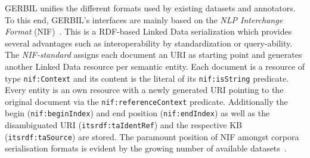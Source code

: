 GERBIL unifies the different formats used by existing datasets and annotators.
To this end, GERBIL's interfaces are mainly based on the \emph{NLP Interchange Format} (NIF)~\cite{ISWC2013NIF}.
This is a \ac{RDF}-based Linked Data serialization which provides several advantages such as interoperability by standardization or query-ability.
The \emph{NIF-standard} assigns each document an URI as starting point and generates another Linked Data resource per semantic entity.
Each document is a resource of type \texttt{nif:Context} and its content is the literal of its \texttt{nif:isString} predicate. 
Every entity is an own resource with a newly generated URI pointing to the original document via the \texttt{nif:referenceContext} predicate.
Additionally the begin (\texttt{nif:beginIndex}) and end position (\texttt{nif:endIndex}) as well as the disambiguated URI (\texttt{itsrdf:taIdentRef}) and the respective \ac{KB} (\texttt{itsrdf:taSource}) are stored.
The paramount position of NIF amongst corpora serialisation formats is evident by the growing number of available datasets~\cite{GERBIL}.

%

